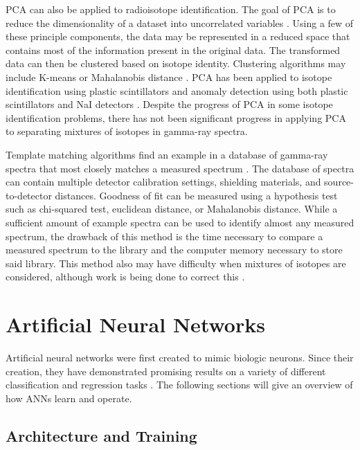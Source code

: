\documentclass[thesis,tocnosub,noragright,centerchapter,12pt,fullpage]{uiucecethesis09}
\begin{document}
PCA can also be applied to radioisotope identification. The goal of PCA is to reduce the dimensionality of a dataset into uncorrelated variables \cite{Jolliffe2002}. Using a few of these principle components, the data may be represented in a reduced space that contains most of the information present in the original data. The transformed data can then be clustered based on isotope identity. Clustering algorithms may include K-means or Mahalanobis distance \cite{Kanungo2002, Kumari2012}. PCA has been applied to isotope identification using plastic scintillators \cite{Boardman2012} and anomaly detection using both plastic scintillators and NaI detectors \cite{runkle2006b}. Despite the progress of PCA in some isotope identification problems, there has not been significant progress in applying PCA to separating mixtures of isotopes in gamma-ray spectra.

Template matching algorithms find an example in a database of gamma-ray spectra that most closely matches a measured spectrum \cite{burr2009}. The database of spectra can contain multiple detector calibration settings, shielding materials, and source-to-detector distances. Goodness of fit can be measured using a hypothesis test such as chi-squared test, euclidean distance, or Mahalanobis distance. While a sufficient amount of example spectra can be used to identify almost any measured spectrum, the drawback of this method is the time necessary to compare a measured spectrum to the library and the computer memory necessary to store said library. This method also may have difficulty when mixtures of isotopes are considered, although work is being done to correct this \cite{mattingly2010}.



\section{Artificial Neural Networks}

Artificial neural networks were first created to mimic biologic neurons. Since their creation, they have demonstrated promising results on a variety of different classification and regression tasks \cite{Jeyanthia2015, Krizhevsky2012, Rababaah2015}. The following sections will give an overview of how ANNs learn and operate.


\subsection{Architecture and Training}
\end{document}
